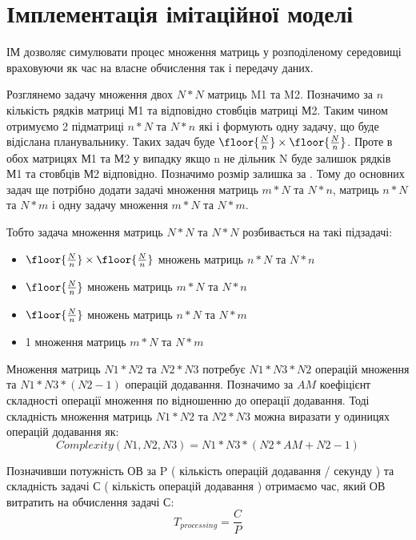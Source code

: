
\section{Імплементація імітаційної моделі}

ІМ дозволяє симулювати процес множення матриць у розподіленому середовищі враховуючи як час на власне обчислення так і передачу даних.

Розглянемо задачу множення двох $N*N$ матриць M1 та M2. Позначимо за $n$ кількість рядків матриці М1 та відповідно стовбців матриці М2. Таким чином отримуємо 2 підматриці $n*N$ та $N*n$ які і формують одну задачу, що буде відіслана планувальнику. Таких задач буде $ \floor{ \frac{N}{n} } \times \floor{ \frac{N}{n} } $. Проте в обох матрицях М1 та М2 у випадку якщо n не дільник N буде залишок рядків М1 та стовбців М2 відповідно. Позначимо розмір залишка за  . Тому до основних задач ще потрібно додати задачі множення матриць $m*N$ та $N*n$, матриць $n*N$ та $N*m$ і одну задачу множення  $m*N$ та $N*m$.

Тобто задача множення матриць $N*N$ та $N*N$ розбивається на такі підзадачі:
\begin{itemize}
	\item $ \floor{ \frac{N}{n} } \times \floor{ \frac{N}{n} } $ множень матриць $n*N$ та $N*n$ 
	\item $ \floor{ \frac{N}{n} } $ множень матриць $m*N$ та $N*n$ 
	\item $ \floor{ \frac{N}{n} } $ множень матриць $n*N$ та $N*m$ 
	\item 1 множення матриць $m*N$ та $N*m$ 
\end{itemize}

Множення матриць $N1*N2$ та $N2*N3$ потребує $N1*N3*N2$ операцій множення та $N1*N3*(N2-1)$ операцій додавання. Позначимо за $AM$ коефіцієнт складності операції множення по відношенню до операції додавання. Тоді складність множення матриць $N1*N2$ та $N2*N3$ можна виразати у одиницях операцій додавання як:
\begin{equation}
\label{eq:complexity_fmla}
Complexity(N1,N2,N3) = N1*N3*( N2 *AM + N2 - 1)
\end{equation}

Позначивши потужність ОВ за P ( кількість операцій додавання / секунду ) та складність задачі С ( кількість операцій додавання ) отримаємо час, який ОВ витратить на обчислення задачі С:
\begin{equation}
\label{eq:processing_time_simple}
T_{processing} = \frac{C}{P}
\end{equation}

